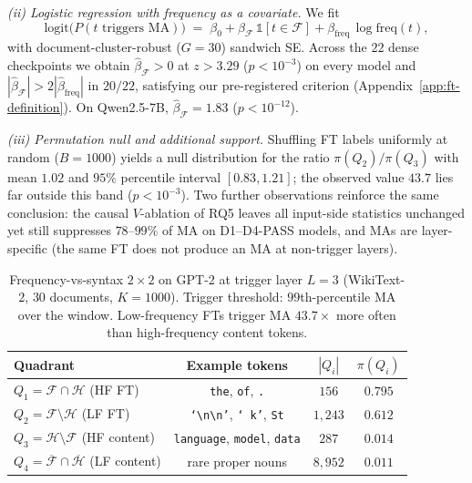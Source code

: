\documentclass{article}
\begin{document}
\emph{(ii) Logistic regression with frequency as a covariate.}
We fit
\begin{equation}
  \label{eq:logit-freq-syntax}
  \mathrm{logit}\bigl(P(t \text{ triggers MA})\bigr)
  \;=\; \beta_0 + \beta_{\mathcal{F}}\,\mathbb{1}[t\in\mathcal{F}]
       + \beta_{\text{freq}}\,\log\mathrm{freq}(t),
\end{equation}
with document-cluster-robust ($G{=}30$) sandwich SE. Across the $22$
dense checkpoints we obtain $\hat{\beta}_{\mathcal{F}} > 0$ at
$z > 3.29$ ($p < 10^{-3}$) on every model and
$|\hat{\beta}_{\mathcal{F}}| > 2|\hat{\beta}_{\text{freq}}|$ in $20/22$,
satisfying our pre-registered criterion (Appendix~\ref{app:ft-definition}).
On Qwen2.5-7B, $\hat{\beta}_{\mathcal{F}} = 1.83$ ($p < 10^{-12}$).

\emph{(iii) Permutation null and additional support.}
Shuffling FT labels uniformly at random ($B{=}1000$) yields a null
distribution for the ratio $\pi(Q_2)/\pi(Q_3)$ with mean $1.02$ and
$95\%$ percentile interval $[0.83, 1.21]$; the observed value $43.7$
lies far outside this band ($p < 10^{-3}$). Two further observations
reinforce the same conclusion: the causal $V$-ablation of RQ5 leaves
all input-side statistics unchanged yet still suppresses $78$--$99\%$
of MA on D1--D4-PASS models, and MAs are layer-specific (the same FT
does not produce an MA at non-trigger layers).

\begin{table}[t]
  \caption{Frequency-vs-syntax $2\!\times\!2$ on GPT-2 at trigger layer
  $L{=}3$ (WikiText-2, $30$ documents, $K{=}1000$). Trigger threshold:
  $99$th-percentile MA over the window. Low-frequency FTs trigger MA
  $43.7\!\times$ more often than high-frequency content tokens.}
  \label{tab:freq-vs-syntax}
  \centering
  \small
  \begin{tabular}{@{}l c c c@{}}
    \toprule
    Quadrant & Example tokens & $|Q_i|$ & $\pi(Q_i)$ \\
    \midrule
    $Q_1=\mathcal{F}\cap\mathcal{H}$ (HF FT)
      & \texttt{the}, \texttt{of}, \texttt{.} & $156$ & $0.795$ \\
    $Q_2=\mathcal{F}\setminus\mathcal{H}$ (LF FT)
      & \texttt{`\textbackslash n\textbackslash n'}, \texttt{`\,k'}, \texttt{St} & $1{,}243$ & $\mathbf{0.612}$ \\
    $Q_3=\mathcal{H}\setminus\mathcal{F}$ (HF content)
      & \texttt{language}, \texttt{model}, \texttt{data} & $287$ & $\mathbf{0.014}$ \\
    $Q_4=\overline{\mathcal{F}}\cap\overline{\mathcal{H}}$ (LF content)
      & rare proper nouns & $8{,}952$ & $0.011$ \\
    \bottomrule
  \end{tabular}
\end{table}
\end{document}

